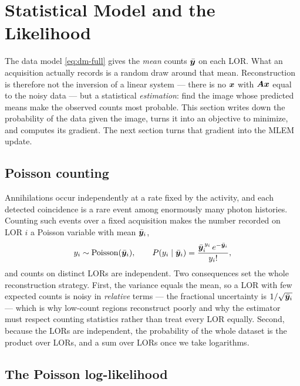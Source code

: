 \section{Statistical Model and the Likelihood}
\label{sec:statistics}

The data model \eqref{eq:dm-full} gives the \emph{mean} counts $\bar{\bm{y}}$ on each
LOR. What an acquisition actually records is a random draw around that mean.
Reconstruction is therefore not the inversion of a linear system --- there is no
$\bm{x}$ with $\bm{A}\bm{x}$ equal to the noisy data --- but a statistical
\emph{estimation}: find the image whose predicted means make the observed counts
most probable. This section writes down the probability of the data given the
image, turns it into an objective to minimize, and computes its gradient. The
next section turns that gradient into the MLEM update.

\subsection{Poisson counting}
\label{sec:statistics:poisson}

Annihilations occur independently at a rate fixed by the activity, and each
detected coincidence is a rare event among enormously many photon histories.
Counting such events over a fixed acquisition makes the number recorded on LOR
$i$ a Poisson variable with mean $\bar{\bm{y}}_i$,
\begin{equation}
  y_i \sim \mathrm{Poisson}(\bar{\bm{y}}_i),
  \qquad
  P(y_i \mid \bar{\bm{y}}_i) = \frac{\bar{\bm{y}}_i^{\,y_i}\,e^{-\bar{\bm{y}}_i}}{y_i!},
  \label{eq:st-poisson}
\end{equation}
and counts on distinct LORs are independent. Two consequences set the whole
reconstruction strategy. First, the variance equals the mean, so a LOR with few
expected counts is noisy in \emph{relative} terms --- the fractional uncertainty
is $1/\sqrt{\bar{\bm{y}}_i}$ --- which is why low-count regions reconstruct poorly and
why the estimator must respect counting statistics rather than treat every LOR
equally. Second, because the LORs are independent, the probability of the whole
dataset is the product over LORs, and a sum over LORs once we take logarithms.

\subsection{The Poisson log-likelihood}
\label{sec:statistics:loglik}

